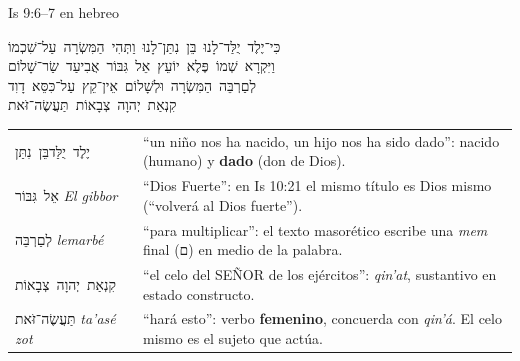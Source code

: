 \documentclass[hyperref={bookmarks=false},aspectratio=169]{beamer}
\newcommand{\heb}[1]{\mbox{\foreignlanguage{hebrew}{#1}}}
\newcommand{\SENOR}{S{\fontsize{0.78em}{1em}\selectfont EÑOR}}
\newcommand{\destacar}[1]{\textbf{\textcolor{azul}{#1}}}
\begin{document}
\begin{frame}{Is 9:6--7 en hebreo}
\begin{center}\heb{כִּי־יֶלֶד יֻלַּד־לָנוּ בֵּן נִתַּן־לָנוּ וַתְּהִי הַמִּשְׂרָה עַל־שִׁכְמוֹ}\\[2pt]
\heb{וַיִּקְרָא שְׁמוֹ פֶּלֶא יוֹעֵץ אֵל גִּבּוֹר אֲבִיעַד שַׂר־שָׁלוֹם}\\[2pt]
\heb{לְםַרְבֵּה הַמִּשְׂרָה וּלְשָׁלוֹם אֵין־קֵץ עַל־כִּסֵּא דָוִד}\\[2pt]
\heb{קִנְאַת יְהוָה צְבָאוֹת תַּעֲשֶׂה־זֹּאת}\end{center}
\scriptsize\renewcommand{\arraystretch}{1.1}
\begin{tabular}{@{}>{\RaggedRight\arraybackslash}p{3.0cm}>{\RaggedRight\arraybackslash}p{8.8cm}@{}}
\toprule
\heb{יֶלֶד יֻלַּד}\newline \heb{בֵּן נִתַּן} & ``un niño nos ha nacido, un hijo nos ha sido dado'': nacido (humano) y \destacar{dado} (don de Dios). \\
\heb{אֵל גִּבּוֹר} \emph{El gibbor} & ``Dios Fuerte'': en Is 10:21 el mismo título es Dios mismo (``volverá al Dios fuerte''). \\
\heb{לְםַרְבֵּה} \emph{lemarbé} & ``para multiplicar'': el texto masorético escribe una \emph{mem} final (\heb{ם}) en medio de la palabra. \\
\heb{קִנְאַת יְהוָה צְבָאוֹת} & ``el celo del \SENOR{} de los ejércitos'': \emph{qin'at}, sustantivo en estado constructo. \\
\heb{תַּעֲשֶׂה־זֹּאת} \emph{ta'asé zot} & ``hará esto'': verbo \destacar{femenino}, concuerda con \emph{qin'á}. El celo mismo es el sujeto que actúa. \\
\bottomrule
\end{tabular}
\end{frame}
\end{document}
